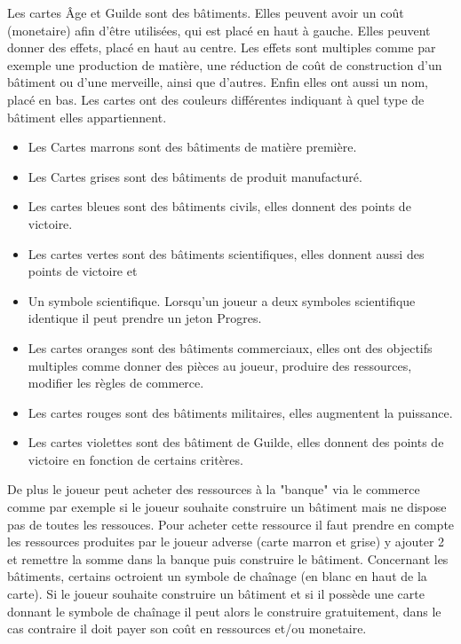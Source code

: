 \documentclass[a4paper, 12pt, french]{article}
\begin{document}
	Les cartes Âge et Guilde sont des bâtiments. Elles peuvent avoir un coût (monetaire) afin d'être
	utilisées, qui est placé en haut à gauche. Elles peuvent donner des effets, placé en haut au centre.
	Les effets sont multiples comme par exemple une production de matière, une réduction de coût de construction
	d'un bâtiment ou d'une merveille, ainsi que d'autres. Enfin elles ont aussi un nom, placé en bas. Les cartes
	ont des couleurs différentes indiquant à quel type de bâtiment elles appartiennent.
	\begin{itemize}
		\item Les Cartes marrons sont des bâtiments de matière première.
		\item Les Cartes grises sont des bâtiments de produit manufacturé.
		\item Les cartes bleues sont des bâtiments civils, elles donnent des points de victoire.
		\item Les cartes vertes sont des bâtiments scientifiques, elles donnent aussi des points de victoire et
		\item Un symbole scientifique. Lorsqu'un joueur a deux symboles scientifique identique
		il peut prendre un jeton Progres.
		\item Les cartes oranges sont des bâtiments commerciaux, elles ont des objectifs multiples comme donner
		des pièces au joueur, produire des ressources, modifier les règles de commerce.
		\item Les cartes rouges sont des bâtiments militaires, elles augmentent la puissance.
		\item Les cartes violettes sont des bâtiment de Guilde, elles donnent des points de victoire en fonction
		de certains critères.
	\end{itemize}

	De plus le joueur peut acheter des ressources à la "banque" via le commerce comme par exemple si le joueur souhaite
	construire un bâtiment mais ne dispose pas de toutes les ressouces. Pour acheter cette ressource il faut prendre
	en compte les ressources produites par le joueur adverse (carte marron et grise) y ajouter 2 et remettre la somme
	dans la banque puis construire le bâtiment. Concernant les bâtiments, certains octroient un symbole de chaînage
	(en blanc en haut de la carte). Si le joueur souhaite construire un bâtiment et si il possède une carte
	donnant le symbole de chaînage il peut alors le construire gratuitement, dans le cas contraire
	il doit payer son coût en ressources et/ou monetaire.
\end{document}
